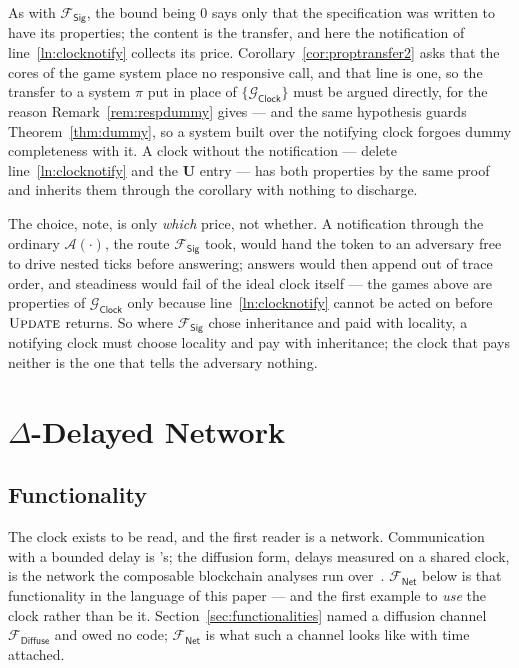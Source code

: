 \documentclass[11pt,a4paper]{article}
\newcommand{\uses}{\mathbf{U}}
\newcommand{\Adv}{\mathcal{A}}
\newcommand{\op}[1]{\textsc{#1}}
\newcommand{\Fdiffuse}{\mathcal{F}_{\mathsf{Diffuse}}}
\newcommand{\Fsig}{\mathcal{F}_{\mathsf{Sig}}}
\newcommand{\Gclock}{\mathcal{G}_{\mathsf{Clock}}}
\newcommand{\Fnet}{\mathcal{F}_{\mathsf{Net}}}
\theoremstyle{accentdef}
\theoremstyle{accentplain}
\begin{document}
As with $\Fsig$, the bound being $0$ says only that the specification was written to have its
properties; the content is the transfer, and here the notification of line~\ref{ln:clocknotify}
collects its price. Corollary~\ref{cor:proptransfer2} asks that the cores of the game system
place no responsive call, and that line is one, so the transfer to a system $\pi$ put in place of
$\{\Gclock\}$ must be argued directly, for the reason Remark~\ref{rem:respdummy} gives --- and
the same hypothesis guards Theorem~\ref{thm:dummy}, so a system built over the notifying clock
forgoes dummy completeness with it. A clock without the notification --- delete
line~\ref{ln:clocknotify} and the $\uses$ entry --- has both properties by the same proof and
inherits them through the corollary with nothing to discharge.

The choice, note, is only \emph{which} price, not whether. A notification through the ordinary
$\Adv(\cdot)$, the route $\Fsig$ took, would hand the token to an adversary free to drive nested
ticks before answering; answers would then append out of trace order, and steadiness would fail
of the ideal clock itself --- the games above are properties of $\Gclock$ only because
line~\ref{ln:clocknotify} cannot be acted on before $\op{Update}$ returns. So where $\Fsig$ chose
inheritance and paid with locality, a notifying clock must choose locality and pay with
inheritance; the clock that pays neither is the one that tells the adversary nothing.

\section{$\Delta$-Delayed Network}\label{sec:fnet}

\subsection{Functionality}\label{sec:fnetfunc}

The clock exists to be read, and the first reader is a network. Communication with a bounded
delay is \cite{KMTZ13}'s; the diffusion form, delays measured on a shared clock, is the network
the composable blockchain analyses run over~\cite{BMTZ17}. $\Fnet$ below is that functionality
in the language of this paper --- and the first example to \emph{use} the clock rather than be
it. Section~\ref{sec:functionalities} named a diffusion channel $\Fdiffuse$ and owed no code;
$\Fnet$ is what such a channel looks like with time attached.
\end{document}

